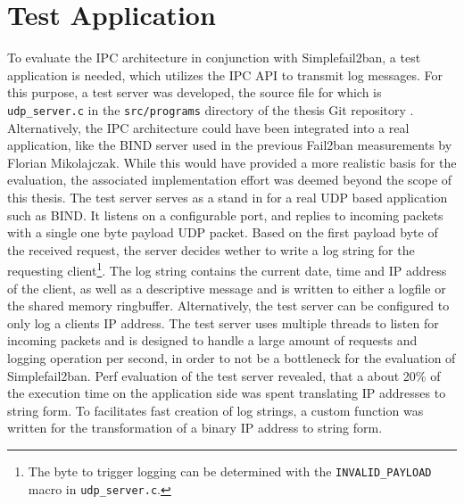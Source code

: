 \section{Test Application}
\label{sec:test_server}

To evaluate the \ac{IPC} architecture in conjunction with Simplefail2ban, a test application is needed, which utilizes the \ac{IPC} API to transmit log
messages. For this purpose, a test server was developed, the source file for which is \texttt{udp\_server.c} in the \texttt{src/programs} directory of the thesis Git repository \cite{gitlab}. 
Alternatively, the \ac{IPC} architecture could have been integrated into a real application, like the BIND server used in the previous Fail2ban measurements by Florian Mikolajczak. While this would have provided a more 
realistic basis for the evaluation, the associated implementation effort was deemed beyond the scope of this thesis. 
The test server serves as a stand in for a real \ac{UDP} based application such as BIND. It listens on a configurable port,
and replies to incoming packets with a single one byte payload UDP packet. Based on the first payload byte of the received request,
the server decides wether to write a log string for the requesting client\footnote{The byte to trigger logging can be determined with the \texttt{INVALID\_PAYLOAD} macro in \texttt{udp\_server.c}.}.
The log string contains the current date, time and \ac{IP} address of the client, as well as a descriptive message and is written to either a logfile or the shared memory ringbuffer.  
Alternatively, the test server can be configured to only log a clients \ac{IP} address. The test server uses multiple threads to listen for incoming packets 
and is designed to handle a large amount of requests and logging operation per second, in order to not be a bottleneck for the evaluation of Simplefail2ban. 
Perf \cite{perf} evaluation of the test server revealed, that a about 20\% of the execution time on the application side was spent translating \ac{IP} addresses to string form.  
To facilitates fast creation of log strings, a custom function was written for the transformation of a binary \ac{IP} address to string form. 
